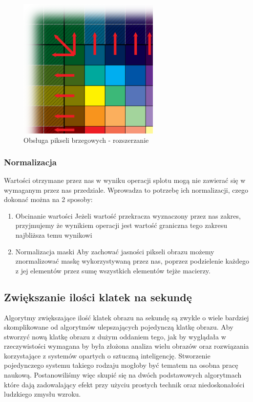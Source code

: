\documentclass[twoside]{projektInzynierskiMS}
\begin{document}
\begin{enumerate}
\begin{figure}[h]
		\centering
		\includegraphics[width=7cm]{extending.png}
		\caption{Obsługa pikseli brzegowych - rozszerzanie}
	\end{figure}
\end{enumerate}
\subsubsection{Normalizacja}
Wartości otrzymane przez nas w wyniku operacji splotu mogą nie zawierać się w wymaganym przez nas przedziale. Wprowadza to potrzebę ich normalizacji, czego dokonać można na 2 sposoby:
\begin{enumerate}
	\item Obcinanie wartości
	Jeżeli wartość przekracza wyznaczony przez nas zakres, przyjmujemy że wynikiem operacji jest wartość graniczna tego zakresu najbliższa temu wynikowi
	\item Normalizacja maski
	Aby zachować jasności pikseli obrazu możemy znormalizować maskę wykorzystywaną przez nas, poprzez podzielenie każdego z jej elementów przez sumę wszystkich elementów tejże macierzy.
\end{enumerate}

\subsection{Zwiększanie ilości klatek na sekundę}
Algorytmy zwiększające ilość klatek obrazu na sekundę są zwykle o wiele bardziej skomplikowane od algorytmów ulepszających pojedynczą klatkę obrazu. Aby stworzyć nową klatkę obrazu z dużym oddaniem tego, jak by wyglądała w rzeczywistości wymagana by była złożona analiza wielu obrazów oraz rozwiązania korzystające z systemów opartych o sztuczną inteligencję. Stworzenie pojedynczego systemu takiego rodzaju mogłoby być tematem na osobna pracę naukową. Postanowiliśmy więc skupić się na dwóch podstawowych algorytmach które dają zadowalający efekt przy użyciu prostych technik oraz niedoskonałości ludzkiego zmysłu wzroku.
\end{document}
